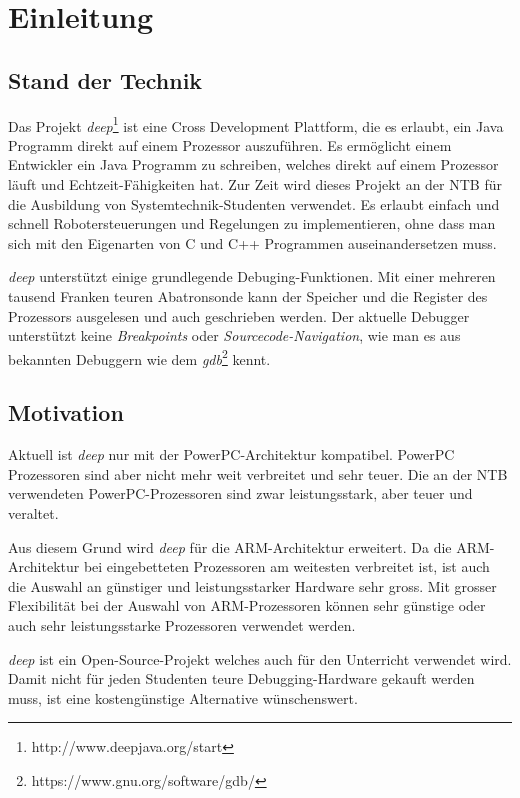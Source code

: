 \chapter{Einleitung}


\section{Stand der Technik}
Das Projekt \textit{deep}\footnote{http://www.deepjava.org/start} ist eine Cross Development Plattform, die es erlaubt, ein Java Programm direkt auf einem Prozessor auszuführen.
Es ermöglicht einem Entwickler ein Java Programm zu schreiben, welches direkt auf einem Prozessor läuft und Echtzeit-Fähigkeiten hat.
Zur Zeit wird dieses Projekt an der NTB für die Ausbildung von Systemtechnik-Studenten verwendet.
Es erlaubt einfach und schnell Robotersteuerungen und Regelungen zu implementieren, ohne dass man sich mit den Eigenarten von C und C++ Programmen auseinandersetzen muss.

\textit{deep} unterstützt einige grundlegende Debuging-Funktionen.
Mit einer mehreren tausend Franken teuren Abatronsonde kann der Speicher und die Register des Prozessors ausgelesen und auch geschrieben werden.
Der aktuelle Debugger unterstützt keine \textit{Breakpoints} oder \textit{Sourcecode-Navigation}, wie man es aus bekannten Debuggern wie dem \textit{gdb}\footnote{https://www.gnu.org/software/gdb/} kennt.



\section{Motivation}
Aktuell ist \textit{deep} nur mit der PowerPC-Architektur kompatibel.
PowerPC Prozessoren sind aber nicht mehr weit verbreitet und sehr teuer.
Die an der NTB verwendeten PowerPC-Prozessoren sind zwar leistungsstark, aber teuer und veraltet.

Aus diesem Grund wird \textit{deep} für die ARM-Architektur erweitert.
Da die ARM-Architektur bei eingebetteten Prozessoren am weitesten verbreitet ist, ist auch die Auswahl an günstiger und leistungsstarker Hardware sehr gross.
Mit grosser Flexibilität bei der Auswahl von ARM-Prozessoren können sehr günstige oder auch sehr leistungsstarke Prozessoren verwendet werden.

\textit{deep} ist ein Open-Source-Projekt welches auch für den Unterricht verwendet wird.
Damit nicht für jeden Studenten teure Debugging-Hardware gekauft werden muss, ist eine kostengünstige Alternative wünschenswert.

